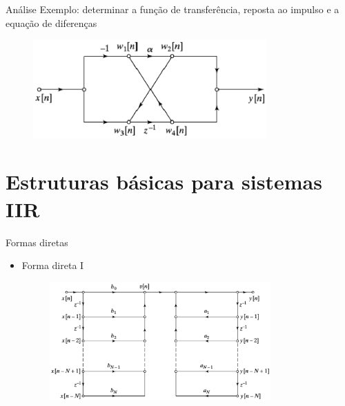 \begin{slide}{Análise}
Exemplo: determinar a função de transferência, reposta ao impulso e a equação de diferenças
   \begin{figure}
       \centering
        \includegraphics[width = 0.8\textwidth]{figs/no-std-form.eps}
   \end{figure}
\end{slide}

\section{Estruturas básicas para sistemas IIR}
\begin{slide}{Formas diretas}
   \begin{itemize}
     \item Forma direta I
   \begin{figure}
       \centering
        \includegraphics[width = 0.8\textwidth]{figs/f1.eps}
   \end{figure}
  \end{itemize}
\end{slide}

